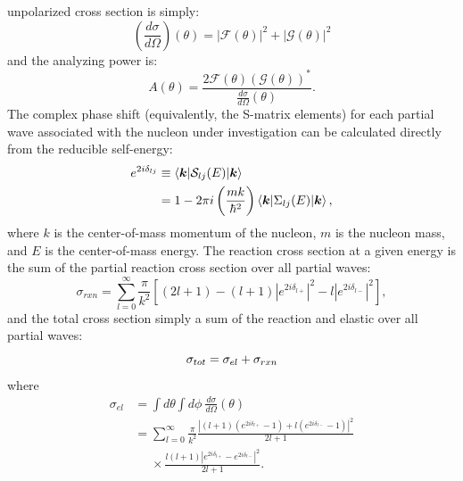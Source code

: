 unpolarized cross section is simply:
\begin{equation}
    \left(\frac{d\sigma}{d\Omega}\right)(\theta) = |\mathcal{F}(\theta)|^{2}
    +|\mathcal{G}(\theta)|^{2}
\end{equation}
and the analyzing power is:
\begin{equation}
    A(\theta) = \frac{2\mathcal{F}(\theta)(\mathcal{G}(\theta))^{*}}
    {\frac{d\sigma}{d\Omega}(\theta)}.
\end{equation}
The complex phase shift (equivalently, the S-matrix elements) for each partial wave associated
with the nucleon under investigation can be
calculated directly from the reducible self-energy:
\begin{equation}
    \begin{split}
        e^{2i\delta_{lj}} & \equiv \braket{\bm{k}|\mathcal{S}_{lj}(E)|\bm{k}}\\
        & = 1 - 2\pi i \left(\frac{mk}{\hbar^{2}}\right)
        \braket{\bm{k}|\Sigma_{lj}(E)|\bm{k}},
    \end{split}
\end{equation}
where $k$ is the center-of-mass momentum of the nucleon, $m$ is the nucleon mass, and $E$ is the
center-of-mass energy. The reaction cross section at a given energy is the sum of the partial
reaction cross section over all partial waves:
\begin{equation}
    \sigma_{rxn} = \sum^{\infty}_{l=0}\frac{\pi}{k^{2}}
    \left[(2l+1)-(l+1)|e^{2i\delta_{l+}}|^{2}-l|e^{2i\delta_{l-}}|^{2}\right],
\end{equation}
and the total cross section simply a sum of the reaction and elastic over all partial waves:
\begin{equation}
    \sigma_{tot} = \sigma_{el} + \sigma_{rxn}\\
\end{equation}
where
\begin{equation}
    \begin{split}
        \sigma_{el} & = \int d\theta \int d\phi\ \frac{d\sigma}{d\Omega}(\theta)\\
        & = \sum^{\infty}_{l=0}\frac{\pi}{k^{2}}
        \frac{|(l+1)(e^{2i\delta_{l+}}-1)+l(e^{2i\delta_{l-}}-1)|^{2}}{2l+1}\\
        & \phantom{ {}= } \times
        \frac{l(l+1)|e^{2i\delta_{l+}}-e^{2i\delta_{l-}}|^{2}}{2l+1}.
    \end{split}
\end{equation}

